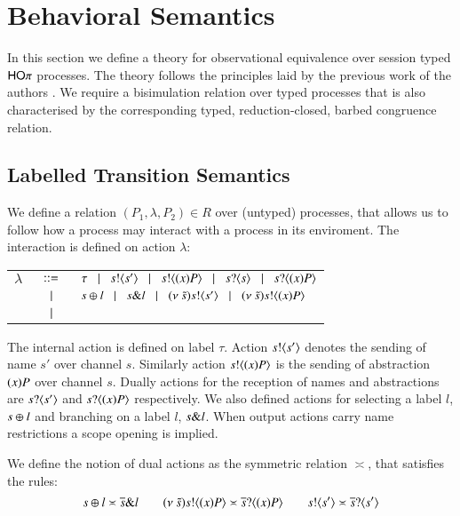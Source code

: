 \section{Behavioral Semantics}

In this section we define a theory for observational equivalence over
session typed $\mathsf{HO}\pi$ processes. The theory follows the principles
laid by the previous work of the authors
\cite{DBLP:conf/forte/KouzapasYH11,KY13,dkphdthesis}.
We require a bisimulation relation over typed processes that
is also characterised by the corresponding typed, reduction-closed,
barbed congruence relation.


\subsection{Labelled Transition Semantics}

We define a relation $(P_1, \lambda, P_2) \in R$ over
(untyped) processes, that allows us to follow how a process may
interact with a process in its enviroment. The interaction
is defined on action $\lambda$:

\begin{tabular}{rcl}
		$\lambda$ &$\;\;::=\;\;$& $\tau \;\;\;|\;\;\; s ! \langle s' \rangle \;\;\;|\;\;\; s ! \langle (x)P \rangle \;\;\;|\;\;\;s ? \langle s \rangle \;\;\;|\;\;\; s ? \langle (x)P \rangle$ \\
		&	$\;\;\;|\;\;\;$ & $s \oplus l \;\;\;|\;\;\; s \& l \;\;\;|\;\;\; (\nu\ \tilde{s}) s ! \langle s' \rangle \;\;\;|\;\;\; (\nu\ \tilde{s}) s ! \langle (x)P \rangle$\\
		&$\;\;\;|\;\;\;$ &	\dk{$\bactout{s}{\tilde{s}} \bnfbar \bactout{s}{\abs{\tilde{x}} P} \bactinp{s}{\tilde{s'}} \bnfbar \bactinp{s}{\abs{\tilde{x}} P}$}
\end{tabular}

The internal action is defined on label $\tau$.
Action $s ! \langle s' \rangle$ denotes the sending of name $s'$ over channel $s$.
Similarly action $s ! \langle (x)P \rangle$ is the sending of abstraction $(x)P$
over channel $s$. Dually actions for the reception of names and abstractions are
$s ? \langle s' \rangle$ and $s ? \langle (x)P \rangle$ respectively. We also defined
actions for selecting a label $l$, $s \oplus l$ and branching on a label
$l$, $s \& l$. When output actions carry name restrictions a scope
opening is implied.

We define the notion of dual actions as the symmetric relation $\asymp$, that satisfies the rules:
\[
	s \oplus l \asymp \overline{s} \& l \qquad (\nu\ \tilde{s}) s ! \langle (x)P \rangle \asymp \overline{s} ? \langle (x)P \rangle \qquad s ! \langle s' \rangle \asymp \overline{s} ? \langle s' \rangle
\]

